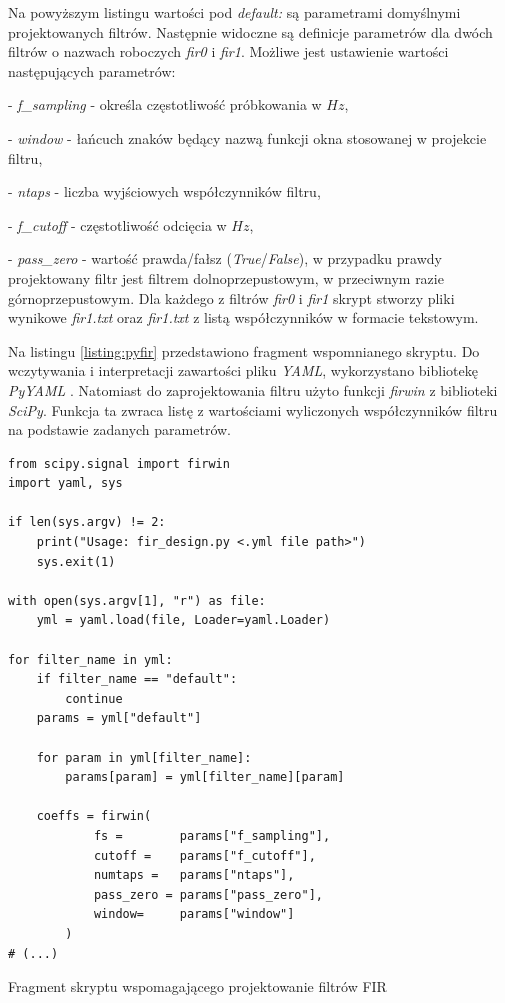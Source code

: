 Na powyższym listingu wartości pod \textit{default:} 
są parametrami domyślnymi projektowanych filtrów. Następnie
widoczne są definicje parametrów dla dwóch filtrów o nazwach roboczych \textit{fir0} i 
\textit{fir1}. Możliwe jest ustawienie wartości następujących parametrów:

- \textit{f\_sampling} - określa częstotliwość próbkowania w $Hz$,

- \textit{window} - łańcuch znaków będący nazwą funkcji okna stosowanej w projekcie filtru,

- \textit{ntaps} - liczba wyjściowych współczynników filtru,

- \textit{f\_cutoff} - częstotliwość odcięcia w $Hz$,

- \textit{pass\_zero} - wartość prawda/fałsz (\textit{True}/\textit{False}), w przypadku
prawdy projektowany filtr jest filtrem dolnoprzepustowym, w przeciwnym razie górnoprzepustowym.
Dla każdego z filtrów \textit{fir0} i \textit{fir1} skrypt stworzy pliki wynikowe \textit{fir1.txt}
oraz \textit{fir1.txt} z listą współczynników w formacie tekstowym.

Na listingu \ref{listing:pyfir} przedstawiono fragment wspomnianego skryptu. Do wczytywania
i interpretacji zawartości pliku \textit{YAML}, wykorzystano bibliotekę \textit{PyYAML} \cite{PyYAML}.
Natomiast do zaprojektowania filtru użyto funkcji \textit{firwin} z biblioteki \textit{SciPy}.
Funkcja ta zwraca listę z wartościami wyliczonych współczynników filtru na podstawie zadanych
parametrów.

\begin{listing}
\begin{verbatim}
from scipy.signal import firwin
import yaml, sys

if len(sys.argv) != 2:
    print("Usage: fir_design.py <.yml file path>")    
    sys.exit(1)

with open(sys.argv[1], "r") as file:
    yml = yaml.load(file, Loader=yaml.Loader)

for filter_name in yml:
    if filter_name == "default":
        continue
    params = yml["default"]

    for param in yml[filter_name]:
        params[param] = yml[filter_name][param]

    coeffs = firwin(
            fs =        params["f_sampling"], 
            cutoff =    params["f_cutoff"], 
            numtaps =   params["ntaps"], 
            pass_zero = params["pass_zero"], 
            window=     params["window"]
        )
# (...)
\end{verbatim}
    \caption{Fragment skryptu wspomagającego projektowanie filtrów FIR}
\label{listing:pyfir}
\end{listing}

